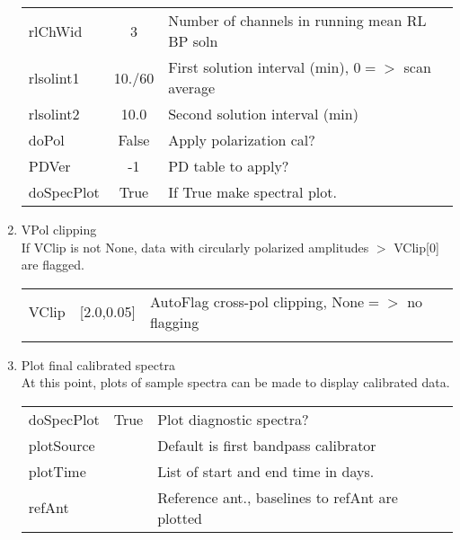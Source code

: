 \documentclass[11pt]{article}
\begin{document}
\begin{enumerate}
\begin{center}
\begin{tabular}{|l|c|l|}
rlChWid     & 3            & Number of channels in running mean RL BP soln\\
rlsolint1   & 10./60       & First solution interval (min), $0=>$ scan average\\
rlsolint2   & 10.0         & Second solution interval (min)\\
doPol       & False        & Apply polarization cal?\\
PDVer       & -1           & PD table to apply?\\
doSpecPlot  & True         & If True make spectral plot.\\
\hline
\end{tabular}
\end{center}
%
\newpage
\item VPol clipping\\
If VClip is not None, data with circularly polarized amplitudes $>$
VClip[0] are flagged. 
\begin{center}
\begin{tabular}{|l|c|l|}
\hline
VClip  & [2.0,0.05] & AutoFlag cross-pol clipping, None$=>$ no flagging  \\
  &  &  \\
\hline
\end{tabular}
\end{center}
%
\item Plot final calibrated spectra\\
At this point, plots of sample spectra can be made to display
calibrated data.
\begin{center}
\begin{tabular}{|l|c|l|}
\hline
doSpecPlot     & True &  Plot diagnostic spectra?\\
plotSource     &      & Default is first bandpass calibrator\\
plotTime       &      & List of start and end time in days.\\
refAnt         &      & Reference ant., baselines to refAnt are plotted \\
\hline
\end{tabular}
\end{center}

\end{enumerate}
\end{document}
